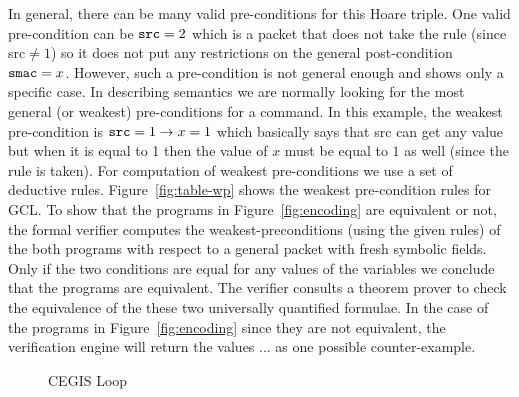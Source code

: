 In general, there can be many valid pre-conditions for this Hoare triple.
One valid pre-condition can be $\mbox{\ttfamily src} = 2$ which is a packet that
does not take the rule (since {\ttfamily src}$\neq1$) 
so it does not put any restrictions on the general post-condition $\mbox{\ttfamily smac} = x$.
However, such a pre-condition is not general enough and shows only a specific case.
In describing semantics we are normally looking for the most general (or weakest)
pre-conditions for a command. 
In this example, the weakest pre-condition is $\mbox{\ttfamily src}=1\rightarrow x = 1$
which basically says that {\ttfamily src} can get any value but when it is equal to 1
then the value of $x$ must be equal to $1$ as well (since the rule is taken).
For computation of weakest pre-conditions we use a set of deductive rules.
Figure~\ref{fig:table-wp} shows the weakest pre-condition rules for GCL.
To show that the programs in Figure~\ref{fig:encoding} are equivalent or not,
the formal verifier computes the weakest-preconditions (using the given rules) 
of the both programs with respect to a general packet with fresh symbolic fields.
Only if the two conditions are equal for any values of the variables we 
conclude that the programs are equivalent.
The verifier consults a theorem prover to check the equivalence of the these two universally quantified formulae.
In the case of the programs in Figure~\ref{fig:encoding} since they are not equivalent, 
the verification engine will return the values ... as one possible counter-example.


\begin{figure}
\caption{CEGIS Loop\label{fig:cegis}}
\end{figure}





